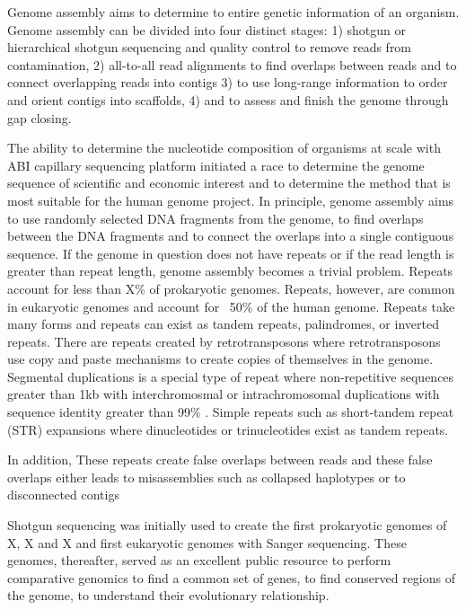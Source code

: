 Genome assembly aims to determine to entire genetic information of an organism.  Genome assembly can be divided into four distinct stages: 1) shotgun or hierarchical shotgun sequencing and quality control to remove reads from contamination, 2) all-to-all read alignments to find overlaps between reads and to connect overlapping reads into contigs 3) to use long-range information to order and orient contigs into scaffolds, 4) and to assess and finish the genome through gap closing. 

The ability to determine the nucleotide composition of organisms at scale with ABI capillary sequencing platform initiated a race to determine the genome sequence of scientific and economic interest and to determine the method that is most suitable for the human genome project. In principle, genome assembly aims to use randomly selected DNA fragments from the genome, to find overlaps between the DNA fragments and to connect the overlaps into a single contiguous sequence. If the genome in question does not have repeats or if the read length is greater than repeat length, genome assembly becomes a trivial problem. Repeats account for less than X\% of prokaryotic genomes. Repeats, however, are common in eukaryotic genomes and account for ~50\% of the human genome. Repeats take many forms and repeats can exist as tandem repeats, palindromes, or inverted repeats. There are repeats created by retrotransposons where retrotransposons use copy and paste mechanisms to create copies of themselves in the genome. Segmental duplications is a special type of repeat where non-repetitive sequences greater than 1kb with interchromosmal or intrachromosomal duplications with sequence identity greater than 99\% \cite{}. Simple repeats such as short-tandem repeat (STR) expansions where dinucleotides or trinucleotides exist as tandem repeats. 

In addition, These repeats create false overlaps between reads and these false overlaps either leads to misassemblies such as collapsed haplotypes or to disconnected contigs\cite{}

Shotgun sequencing was initially used to create the first prokaryotic genomes of X, X and X and first eukaryotic genomes with Sanger sequencing. These genomes, thereafter, served as an excellent public resource to perform comparative genomics to find a common set of genes, to find conserved regions of the genome, to understand their evolutionary relationship. 




